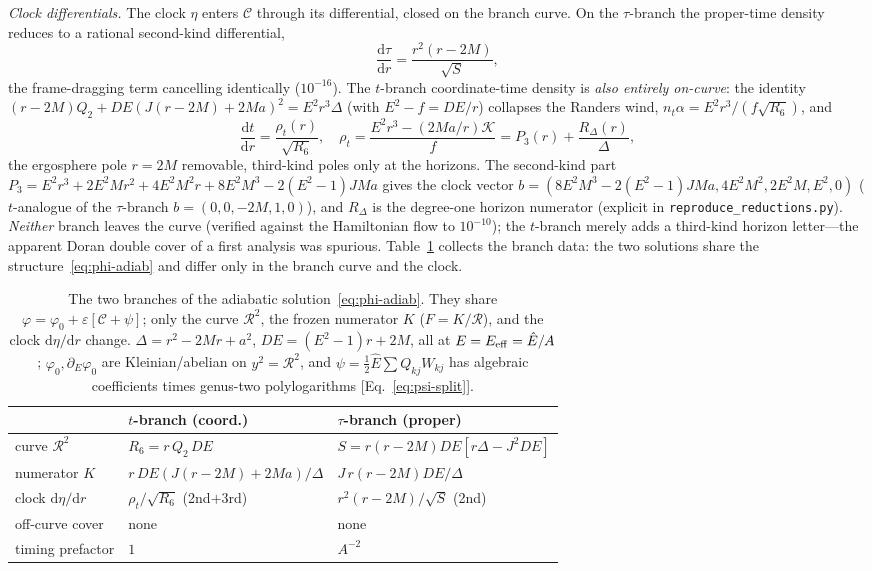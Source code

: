 \documentclass[
    aps, prd, twocolumn, superscriptaddress,
    showpacs, nofootinbib, floatfix
]{revtex4-2}
\newcommand{\Ehat}{\hat E}
\newcommand{\dd}{\mathrm{d}}
\begin{document}
\emph{Clock differentials.} The clock $\eta$ enters $\mathcal{C}$ through its
differential, closed on the branch curve. On the $\tau$-branch the proper-time
density reduces to a rational second-kind differential,
\begin{equation}
    \frac{\dd\tau}{\dd r}=\frac{r^2(r-2M)}{\sqrt{S}},
    \label{eq:clock-tau}
\end{equation}
the frame-dragging term cancelling identically ($10^{-16}$). The $t$-branch
coordinate-time density is \emph{also entirely on-curve}: the identity
$(r-2M)Q_2+DE(J(r-2M)+2Ma)^2=E^2r^3\Delta$ (with $E^2-f=DE/r$) collapses the Randers
wind, $n_t\alpha=E^2r^3/(f\sqrt{R_6})$, and
\begin{equation}
    \frac{\dd t}{\dd r}=\frac{\rho_t(r)}{\sqrt{R_6}},\quad
    \rho_t=\frac{E^2r^3-(2Ma/r)\mathcal K}{f}=P_3(r)+\frac{R_\Delta(r)}{\Delta},
    \label{eq:clock-t}
\end{equation}
the ergosphere pole $r=2M$ removable, third-kind poles only at the horizons. The
second-kind part $P_3=E^2r^3+2E^2Mr^2+4E^2M^2r+8E^2M^3-2(E^2-1)JMa$ gives the clock
vector $b=(8E^2M^3-2(E^2-1)JMa,4E^2M^2,2E^2M,E^2,0)$ ($t$-analogue of the $\tau$-branch
$b=(0,0,-2M,1,0)$), and $R_\Delta$ is the degree-one horizon numerator (explicit in
\texttt{reproduce\_reductions.py}). \emph{Neither} branch leaves the curve (verified
against the Hamiltonian flow to $10^{-10}$); the $t$-branch merely adds a third-kind
horizon letter---the apparent Doran double cover of a first analysis was spurious.
Table~\ref{tab:branch-adiab} collects the branch data: the two solutions share the
structure~\eqref{eq:phi-adiab} and differ only in the branch curve and the clock.
\begin{table}[t]
    \centering
    \caption{The two branches of the adiabatic solution~\eqref{eq:phi-adiab}. They
    share $\varphi=\varphi_0+\varepsilon[\mathcal{C}+\psi]$;
    only the curve $\mathcal{R}^2$, the frozen numerator $K$ ($F=K/\mathcal{R}$),
    and the clock $\dd\eta/\dd r$ change. $\Delta=r^2-2Mr+a^2$, $DE=(E^2-1)r+2M$,
    all at $E=E_{\rm eff}=\Ehat/A$; $\varphi_0,\partial_E\varphi_0$ are
    Kleinian/abelian on $y^2=\mathcal{R}^2$, and $\psi=\tfrac12\Ehat\sum Q_{kj}W_{kj}$
    has algebraic coefficients times genus-two polylogarithms
    [Eq.~\eqref{eq:psi-split}].}
    \label{tab:branch-adiab}
    \begin{ruledtabular}
    \begin{tabular}{lll}
         & $t$-branch (coord.) & $\tau$-branch (proper)\\
        \hline
        curve $\mathcal{R}^2$ & $R_6=r\,Q_2\,DE$ & $S=r(r{-}2M)DE[r\Delta{-}J^2DE]$\\
        numerator $K$ & $r\,DE(J(r{-}2M){+}2Ma)/\Delta$ & $J\,r(r{-}2M)DE/\Delta$\\
        clock $\dd\eta/\dd r$ & $\rho_t/\sqrt{R_6}$ (2nd$+$3rd)
            & $r^2(r-2M)/\sqrt{S}$ (2nd)\\
        off-curve cover & none & none\\
        timing prefactor & $1$ & $A^{-2}$\\
    \end{tabular}
    \end{ruledtabular}
\end{table}
\end{document}
